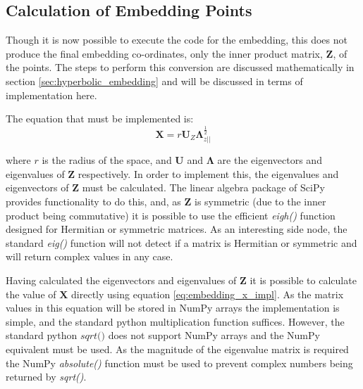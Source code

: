 \subsection{Calculation of Embedding Points}

Though it is now possible to execute the code for the embedding, this does not produce the final embedding co-ordinates, only the inner product matrix, $\boldsymbol{Z}$, of the points. The steps to perform this conversion are discussed mathematically in section \ref{sec:hyperbolic_embedding} and will be discussed in terms of implementation here. 

The equation that must be implemented is:
\begin{equation}
\label{eq:embedding_x_impl}
\boldsymbol{X}=r\boldsymbol{U}_Z\boldsymbol{\Lambda}_{z||}^{\frac{1}{2}}
\end{equation}

where $r$ is the radius of the space, and $\boldsymbol{U}$ and $\boldsymbol{\Lambda}$ are the eigenvectors and eigenvalues of $\boldsymbol{Z}$ respectively. In order to implement this, the eigenvalues and eigenvectors of $\boldsymbol{Z}$ must be calculated. The linear algebra package of SciPy provides functionality to do this, and, as $\boldsymbol{Z}$ is symmetric (due to the inner product being commutative) it is possible to use the efficient \textit{eigh()} function designed for Hermitian or symmetric matrices. As an interesting side node, the standard \textit{eig()} function will not detect if a matrix is Hermitian or symmetric and will return complex values in any case. 

Having calculated the eigenvectors and eigenvalues of $\boldsymbol{Z}$ it is possible to calculate the value of $\boldsymbol{X}$ directly using equation \ref{eq:embedding_x_impl}. As the matrix values in this equation will be stored in NumPy arrays the implementation is simple, and the standard python multiplication function suffices. However, the standard python $\textit{sqrt()}$ does not support NumPy arrays and the NumPy equivalent must be used. As the magnitude of the eigenvalue matrix is required the NumPy \textit{absolute()} function must be used to prevent complex numbers being returned by \textit{sqrt()}.

